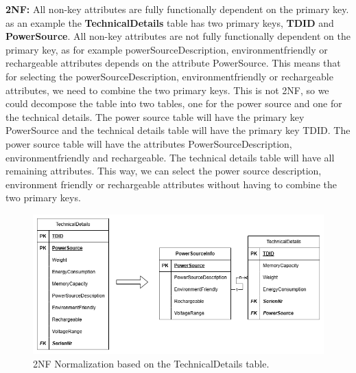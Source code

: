 \documentclass{article}
\begin{document}
\textbf{2NF:} All non-key attributes are fully functionally dependent on the primary key. as an example the \textbf{TechnicalDetails} table has two primary keys, \textbf{TDID} and \textbf{PowerSource}. All non-key attributes are not fully functionally dependent on the primary key, as for example powerSourceDescription, environmentfriendly or rechargeable attributes depends on the attribute PowerSource. This means that for selecting the powerSourceDescription, environmentfriendly or rechargeable attributes, we need to combine the two primary keys. This is not 2NF, so we could decompose the table into two tables, one for the power source and one for the technical details. The power source table will have the primary key PowerSource and the technical details table will have the primary key TDID. The power source table will have the attributes PowerSourceDescription, environmentfriendly and rechargeable. The technical details table will have all remaining attributes. This way, we can select the power source description, environment friendly or rechargeable attributes without having to combine the two primary keys.
\begin{figure}[H]
\centering
\includegraphics[width=\linewidth]{img/2nf.png}
\caption{2NF Normalization based on the TechnicalDetails table.}
\end{figure}
\end{document}
